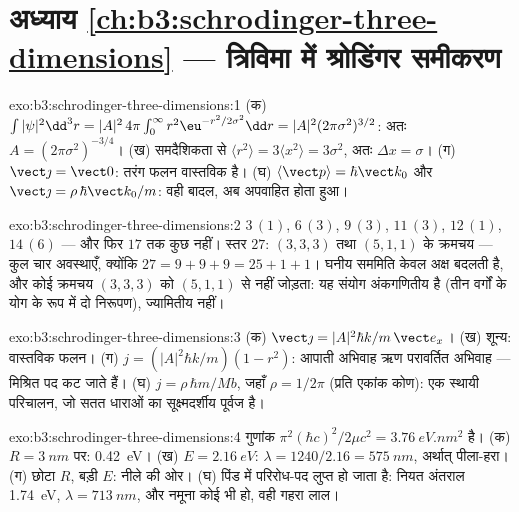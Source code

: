 \section*{अध्याय \ref{ch:b3:schrodinger-three-dimensions} --- त्रिविमा में श्रोडिंगर समीकरण}

\begin{solution}{exo:b3:schrodinger-three-dimensions:1}
(क) $\int|\psi|^2\dd^3r = |A|^2\,4\pi\int_0^\infty r^2\eu^{-r^2/2
\sigma^2}\dd r = |A|^2(2\pi\sigma^2)^{3/2}$: अतः $A = (2\pi\sigma^2)^{
-3/4}$। (ख) समदैशिकता से $\langle r^2\rangle = 3\langle x^2\rangle =
3\sigma^2$, अतः $\Delta x = \sigma$। (ग) $\vect\jmath = \vect 0$:
तरंग फलन वास्तविक है। (घ) $\langle\vect p\rangle = \hbar\vect k_0$
और $\vect\jmath = \rho\,\hbar\vect k_0/m$: वही बादल, अब
अपवाहित होता हुआ।
\end{solution}

\begin{solution}{exo:b3:schrodinger-three-dimensions:2}
$3\,(1)$, $6\,(3)$, $9\,(3)$, $11\,(3)$, $12\,(1)$, $14\,(6)$ ---
और फिर $17$ तक कुछ नहीं। स्तर $27$: $(3,3,3)$ तथा
$(5,1,1)$ के क्रमचय --- कुल चार अवस्थाएँ, क्योंकि $27 = 9+9+9 = 25+1+1$।
घनीय सममिति केवल अक्ष बदलती है, और कोई क्रमचय $(3,3,3)$ को
$(5,1,1)$ से नहीं जोड़ता: यह संयोग अंकगणितीय है (तीन वर्गों के योग के
रूप में दो निरूपण), ज्यामितीय नहीं।
\end{solution}

\begin{solution}{exo:b3:schrodinger-three-dimensions:3}
(क) $\vect\jmath = |A|^2\hbar k/m\,\vect e_x$। (ख) शून्य: वास्तविक
फलन। (ग) $j = (|A|^2\hbar k/m)(1 - r^2)$: आपाती अभिवाह ऋण
परावर्तित अभिवाह --- मिश्रित पद कट जाते हैं। (घ) $j = \rho\,\hbar
m/Mb$, जहाँ $\rho = 1/2\pi$ (प्रति एकांक कोण): एक स्थायी
परिचालन, जो सतत धाराओं का सूक्ष्मदर्शीय पूर्वज है।
\end{solution}

\begin{solution}{exo:b3:schrodinger-three-dimensions:4}
गुणांक $\pi^2(\hbar c)^2/2\mu c^2 = \qty{3.76}{eV.nm^2}$ है।
(क) $R = \qty{3}{nm}$ पर: \qty{0.42}{eV}। (ख) $E = \qty{2.16}{eV}$:
$\lambda = 1240/2.16 = \qty{575}{nm}$, अर्थात् पीला-हरा। (ग) छोटा $R$,
बड़ी $E$: नीले की ओर। (घ) पिंड में परिरोध-पद
लुप्त हो जाता है: नियत अंतराल \qty{1.74}{eV}, $\lambda = \qty{713}{nm}$,
और नमूना कोई भी हो, वही गहरा लाल।
\end{solution}

